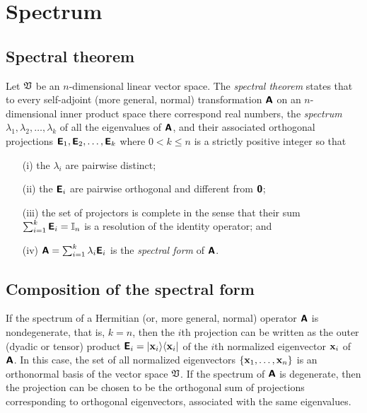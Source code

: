 \section{Spectrum}

\subsection{Spectral theorem}
\label{2012-m-ch-Spectraltheorem}


Let $\frak V$ be an $n$-dimensional linear vector space.
The {\em spectral theorem} states
that to every self-adjoint (more general, normal) transformation $ \textsf{\textbf{A}}$
on an $n$-dimensional inner product space there correspond real numbers, the {\em spectrum}
$
\lambda_1,
\lambda_2, \ldots ,
\lambda_k
$
of all the eigenvalues of   $ \textsf{\textbf{A}}$,
and their associated  orthogonal projections
$
\textsf{\textbf{E}}_1,
\textsf{\textbf{E}}_2, \ldots ,
\textsf{\textbf{E}}_k
$
where $0<k\le n$ is a strictly positive integer so that
\begin{itemize}
\item[(i)]
the $\lambda_i$ are pairwise distinct;
\item[(ii)]
the $\textsf{\textbf{E}}_i$ are pairwise orthogonal and different from $\textsf{\textbf{0}}$;
\item[(iii)]
the set of projectors is complete in the sense that their
sum $\sum_{i=1}^k \textsf{\textbf{E}}_i={\Bbb I}_n$
is a resolution of the identity operator; and
\item[(iv)]
$
\textsf{\textbf{A}}=\sum_{i=1}^k \lambda_i\textsf{\textbf{E}}_i
$
is the {\em spectral form} of $\textsf{\textbf{A}}$.
\end{itemize}



\subsection{Composition of the spectral form}

If the spectrum of a  Hermitian (or, more general, normal) operator $\textsf{\textbf{A}}$ is nondegenerate, that is, $k=n$, then the
$i$th projection
can be written as the outer (dyadic or tensor) product
$
\textsf{\textbf{E}}_i= \vert {\bf x}_i \rangle \langle {\bf x}_i\vert$
of the $i$th normalized eigenvector ${\bf x}_i $ of $\textsf{\textbf{A}}$.
In this case, the set of all normalized eigenvectors $\{{\bf x}_1, \ldots ,{\bf x}_n\}$ is an orthonormal basis of the vector space $\frak V$.
If the spectrum of $\textsf{\textbf{A}}$ is degenerate, then the projection can be chosen to be the orthogonal sum of projections
corresponding to orthogonal eigenvectors, associated with the same  eigenvalues.

